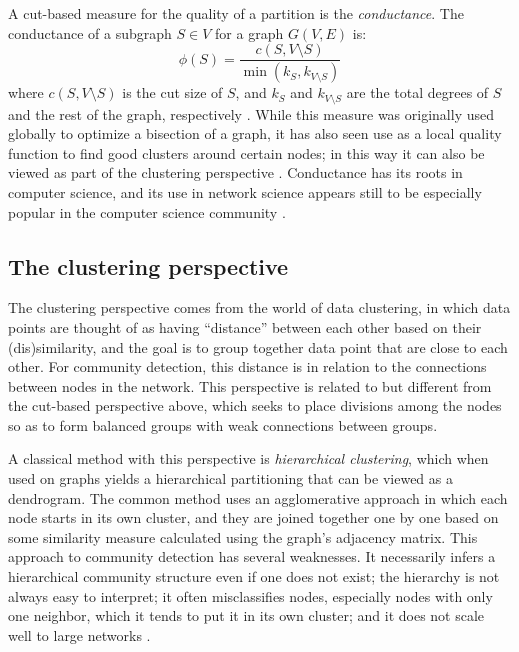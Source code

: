 A cut-based measure for the quality of a partition is the
\emph{conductance}. The conductance of a subgraph \(S \in V\) for a
graph \(G(V, E)\) is:
\[\phi(S) = \frac{c(S, V \setminus S)}{\min(k_S, k_{V \setminus S})}\]
where \(c(S, V \setminus S)\) is the cut size of \(S\), and \(k_S\) and
\(k_{V \setminus S}\) are the total degrees of \(S\) and the rest of the
graph, respectively \autocite{schaeffer_graph_2007}. While this measure
was originally used globally to optimize a bisection of a graph, it has
also seen use as a local quality function to find good clusters around
certain nodes; in this way it can also be viewed as part of the
clustering perspective \autocite{schaub_many_2017}. Conductance has its
roots in computer science, and its use in network science appears still
to be especially popular in the computer science community
\autocites{schaeffer_graph_2007}{yang_defining_2015}.

\hypertarget{clustering-perspective}{\subsection{The clustering
perspective}\label{clustering-perspective}}

The clustering perspective comes from the world of data clustering, in
which data points are thought of as having ``distance'' between each
other based on their (dis)similarity, and the goal is to group together
data point that are close to each other. For community detection, this
distance is in relation to the connections between nodes in the network.
This perspective is related to but different from the cut-based
perspective above, which seeks to place divisions among the nodes so as
to form balanced groups with weak connections between groups.

A classical method with this perspective is \emph{hierarchical
clustering}, which when used on graphs yields a hierarchical
partitioning that can be viewed as a dendrogram. The common method uses
an agglomerative approach in which each node starts in its own cluster,
and they are joined together one by one based on some similarity measure
calculated using the graph's adjacency matrix. This approach to
community detection has several weaknesses. It necessarily infers a
hierarchical community structure even if one does not exist; the
hierarchy is not always easy to interpret; it often misclassifies nodes,
especially nodes with only one neighbor, which it tends to put it in its
own cluster; and it does not scale well to large networks
\autocite{fortunato_community_2010}.

